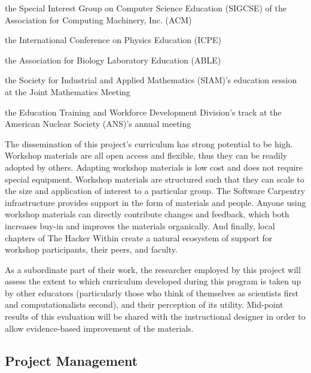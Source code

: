 \documentclass{proposalnsf}
\newlength{\up}
\begin{document}
\begin{compactitem}

\item
  the Special Interest Group on Computer Science Education (SIGCSE) of the Association for Computing Machinery, Inc. (ACM)

\item
  the International Conference on Physics Education (ICPE)

\item
  the Association for Biology Laboratory Education (ABLE)

\item
  the Society for Industrial and Applied Mathematics (SIAM)'s education session at the Joint Mathematics Meeting

\item
  the Education Training and Workforce Development Division's track at the American Nuclear Society (ANS)'s annual meeting

\end{compactitem}

The dissemination of this project's curriculum has strong potential to
be high. Workshop materials are all open access and flexible, thus
they can be readily adopted by others. Adapting workshop materials is
low cost and does not require special equipment. Workshop materials
are structured such that they can scale to the size and application of
interest to a particular group. The Software Carpentry infrastructure
provides support in the form of materials and people. Anyone using
workshop materials can directly contribute changes and feedback, which
both increases buy-in and improves the materials organically. And
finally, local chapters of The Hacker Within create a natural
ecosystem of support for workshop participants, their peers, and
faculty.

As a subordinate part of their work, the researcher employed by this
project will assess the extent to which curriculum developed during
this program is taken up by other educators (particularly those who
think of themselves as scientists first and computationalists second),
and their perception of its utility.  Mid-point results of this
evaluation will be shared with the instructional designer in order to
allow evidence-based improvement of the materials.

\subsection{Project Management}
\end{document}
